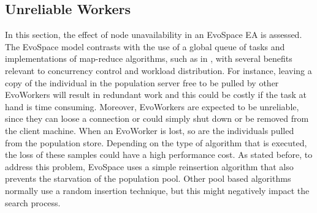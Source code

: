 \subsection{Unreliable Workers}
In this section, the effect of node unavailability in an EvoSpace EA is assessed.
The EvoSpace model contrasts with the use of a global queue of tasks and implementations
of map-reduce algorithms, such as in \cite{fazenda2012}, with several benefits relevant to
concurrency control and workload distribution. 
For instance, leaving a copy of the individual in the population server
free to be pulled by other EvoWorkers will result in redundant work and this
could be costly if the task at hand is time consuming. Moreover, EvoWorkers are expected
to be unreliable, since they can loose a connection or could simply shut down or be removed from the client machine.
When an EvoWorker is lost, so are the individuals pulled from the population store.
Depending on the type of algorithm that is executed, the loss of these samples could have a high performance cost.
As stated before, to address this problem, EvoSpace uses a simple reinsertion algorithm that also prevents
the starvation of the population pool. Other pool based algorithms normally use
a random insertion technique, but this might negatively impact the search process.

